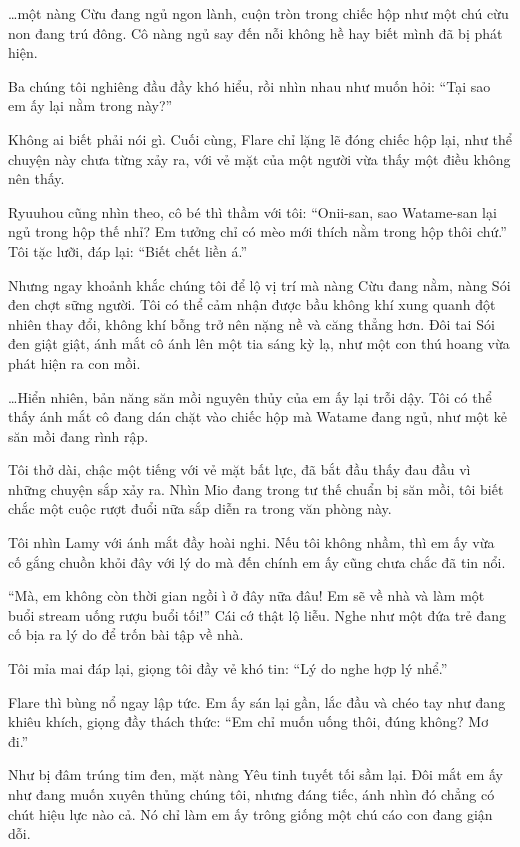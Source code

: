 \documentclass[../main.tex]{subfiles}
\begin{document}
\dots một nàng Cừu đang ngủ ngon lành, cuộn tròn trong chiếc hộp như một chú cừu non đang trú đông. Cô nàng ngủ say đến nỗi không hề hay biết mình đã bị phát hiện.


Ba chúng tôi nghiêng đầu đầy khó hiểu, rồi nhìn nhau như muốn hỏi: ``Tại sao em ấy lại nằm trong này?''

Không ai biết phải nói gì. Cuối cùng, Flare chỉ lặng lẽ đóng chiếc hộp lại, như thể chuyện này chưa từng xảy ra, với vẻ mặt của một người vừa thấy một điều không nên thấy.

Ryuuhou cũng nhìn theo, cô bé thì thầm với tôi: ``Onii-san, sao Watame-san lại ngủ trong hộp thế nhỉ? Em tưởng chỉ có mèo mới thích nằm trong hộp thôi chứ.'' Tôi tặc lưỡi, đáp lại: ``Biết chết liền á.''

Nhưng ngay khoảnh khắc chúng tôi để lộ vị trí mà nàng Cừu đang nằm, nàng Sói đen chợt sững người. Tôi có thể cảm nhận được bầu không khí xung quanh đột nhiên thay đổi, không khí bỗng trở nên nặng nề và căng thẳng hơn. Đôi tai Sói đen giật giật, ánh mắt cô ánh lên một tia sáng kỳ lạ, như một con thú hoang vừa phát hiện ra con mồi.

\dots Hiển nhiên, bản năng săn mồi nguyên thủy của em ấy lại trỗi dậy. Tôi có thể thấy ánh mắt cô đang dán chặt vào chiếc hộp mà Watame đang ngủ, như một kẻ săn mồi đang rình rập.

Tôi thở dài, chậc một tiếng với vẻ mặt bất lực, đã bắt đầu thấy đau đầu vì những chuyện sắp xảy ra. Nhìn Mio đang trong tư thế chuẩn bị săn mồi, tôi biết chắc một cuộc rượt đuổi nữa sắp diễn ra trong văn phòng này.

\ct

Tôi nhìn Lamy với ánh mắt đầy hoài nghi. Nếu tôi không nhầm, thì em ấy vừa cố gắng chuồn khỏi đây với lý do mà đến chính em ấy cũng chưa chắc đã tin nổi.

``Mà, em không còn thời gian ngồi ì ở đây nữa đâu! Em sẽ về nhà và làm một buổi stream uống rượu buổi tối!'' Cái cớ thật lộ liễu. Nghe như một đứa trẻ đang cố bịa ra lý do để trốn bài tập về nhà.

Tôi mỉa mai đáp lại, giọng tôi đầy vẻ khó tin: ``Lý do nghe hợp lý nhể.''

Flare thì bùng nổ ngay lập tức. Em ấy sán lại gần, lắc đầu và chéo tay như đang khiêu khích, giọng đầy thách thức: ``Em chỉ muốn uống thôi, đúng không? Mơ đi.''

Như bị đâm trúng tim đen, mặt nàng Yêu tinh tuyết tối sầm lại. Đôi mắt em ấy như đang muốn xuyên thủng chúng tôi, nhưng đáng tiếc, ánh nhìn đó chẳng có chút hiệu lực nào cả. Nó chỉ làm em ấy trông giống một chú cáo con đang giận dỗi.
\end{document}
